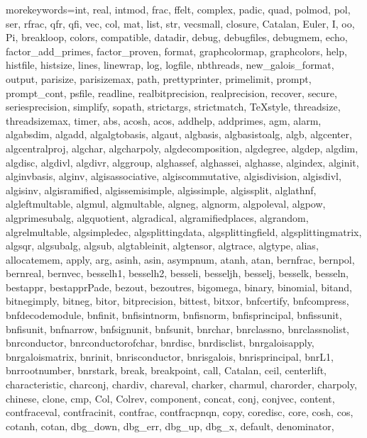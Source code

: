 %
  {morekeywords={int, real, intmod, frac, ffelt, complex, padic, quad, polmod,%
   pol, ser, rfrac, qfr, qfi, vec, col, mat, list, str, vecsmall, closure,%
   Catalan, Euler, I, oo, Pi, breakloop, colors, compatible, datadir, debug,%
   debugfiles, debugmem, echo, factor_add_primes, factor_proven, format,%
   graphcolormap, graphcolors, help, histfile, histsize, lines, linewrap,%
   log, logfile, nbthreads, new_galois_format, output, parisize, parisizemax,%
   path, prettyprinter, primelimit, prompt, prompt_cont, psfile, readline,%
   realbitprecision, realprecision, recover, secure, seriesprecision,%
   simplify, sopath, strictargs, strictmatch, TeXstyle, threadsize,%
   threadsizemax, timer, abs, acosh, acos, addhelp, addprimes, agm, alarm,%
   algabsdim, algadd, algalgtobasis, algaut, algbasis, algbasistoalg, algb,%
   algcenter, algcentralproj, algchar, algcharpoly, algdecomposition,%
   algdegree, algdep, algdim, algdisc, algdivl, algdivr, alggroup,%
   alghassef, alghassei, alghasse, algindex, alginit, alginvbasis, alginv,%
   algisassociative, algiscommutative, algisdivision, algisdivl, algisinv,%
   algisramified, algissemisimple, algissimple, algissplit, alglathnf,%
   algleftmultable, algmul, algmultable, algneg, algnorm, algpoleval, algpow,%
   algprimesubalg, algquotient, algradical, algramifiedplaces, algrandom,%
   algrelmultable, algsimpledec, algsplittingdata, algsplittingfield,%
   algsplittingmatrix, algsqr, algsubalg, algsub, algtableinit, algtensor,%
   algtrace, algtype, alias, allocatemem, apply, arg, asinh, asin, asympnum,%
   atanh, atan, bernfrac, bernpol, bernreal, bernvec, besselh1, besselh2,%
   besseli, besseljh, besselj, besselk, besseln, bestappr, bestapprPade,%
   bezout, bezoutres, bigomega, binary, binomial, bitand, bitnegimply,%
   bitneg, bitor, bitprecision, bittest, bitxor, bnfcertify, bnfcompress,%
   bnfdecodemodule, bnfinit, bnfisintnorm, bnfisnorm, bnfisprincipal,%
   bnfissunit, bnfisunit, bnfnarrow, bnfsignunit, bnfsunit, bnrchar,%
   bnrclassno, bnrclassnolist, bnrconductor, bnrconductorofchar, bnrdisc,%
   bnrdisclist, bnrgaloisapply, bnrgaloismatrix, bnrinit, bnrisconductor,%
   bnrisgalois, bnrisprincipal, bnrL1, bnrrootnumber, bnrstark, break,%
   breakpoint, call, Catalan, ceil, centerlift, characteristic, charconj,%
   chardiv, chareval, charker, charmul, charorder, charpoly, chinese, clone,%
   cmp, Col, Colrev, component, concat, conj, conjvec, content, contfraceval,%
   contfracinit, contfrac, contfracpnqn, copy, coredisc, core, cosh, cos,%
   cotanh, cotan, dbg_down, dbg_err, dbg_up, dbg_x, default, denominator,%
}}
